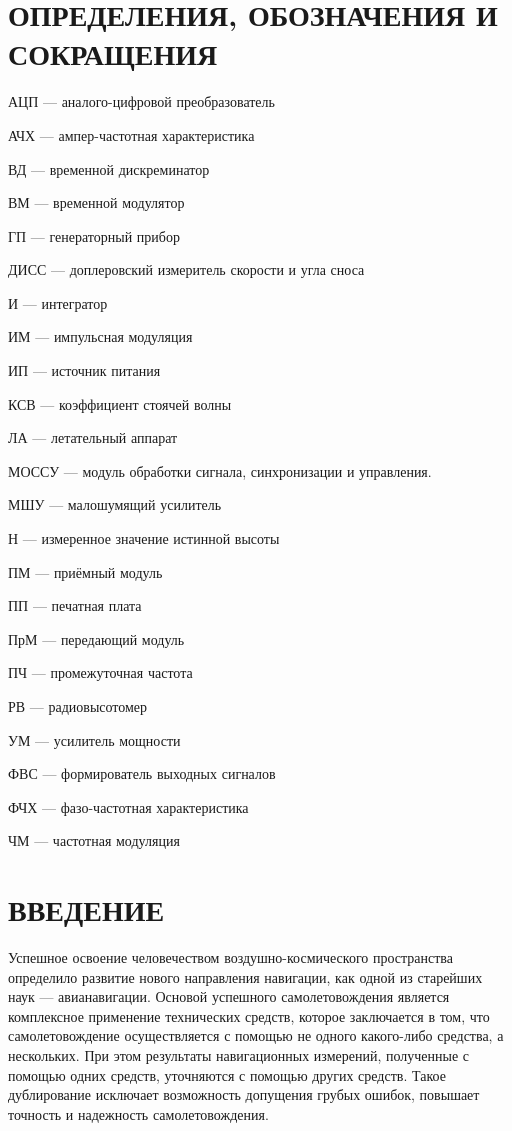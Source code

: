 \documentclass[utf8x, 14pt, oneside, a4paper]{article}
\begin{document}
	\pagebreak
	
	\begin{center}
		\renewcommand{\contentsname}{\normalsize\bfseries\centering СОДЕРЖАНИЕ}
		\small
		\tableofcontents
		\normalsize
	\end{center}
	
	\pagebreak
	

	
	\section*{ОПРЕДЕЛЕНИЯ, ОБОЗНАЧЕНИЯ И СОКРАЩЕНИЯ}
	
	АЦП --- аналого-цифровой преобразователь
	
	АЧХ --- ампер-частотная характеристика
	
	ВД --- временной дискреминатор
	
	ВМ --- временной модулятор
	
	ГП --- генераторный прибор
	
	ДИСС --- доплеровский измеритель скорости и угла сноса
	
	И --- интегратор
	
	ИМ --- импульсная модуляция
	
	ИП --- источник питания
	
	КСВ --- коэффициент стоячей волны
	
	ЛА --- летательный аппарат
	
	МОССУ --- модуль обработки сигнала, синхронизации и управления.
	
	МШУ --- малошумящий усилитель
	
	Н --- измеренное значение истинной высоты
	
	ПМ --- приёмный модуль
	
	ПП --- печатная плата
	
	ПрМ --- передающий модуль
	
	ПЧ --- промежуточная частота
	
	РВ --- радиовысотомер
	
	УМ --- усилитель мощности
	
	ФВС --- формирователь выходных сигналов
	
	ФЧХ --- фазо-частотная характеристика
	
	ЧМ --- частотная модуляция
	
	
	\pagebreak
	
	\section*{ВВЕДЕНИЕ}
		Успешное освоение человечеством воздушно-космического пространства определило развитие нового направления  навигации, как одной из старейших наук --- авианавигации. Основой успешного самолетовождения является комплексное применение технических средств, которое заключается в том, что самолетовождение осуществляется с помощью не одного какого-либо средства, а нескольких. При этом результаты навигационных измерений, полученные с помощью одних средств, уточняются с помощью других средств. Такое дублирование исключает возможность допущения грубых ошибок, повышает точность и надежность самолетовождения. 
		
\end{document}
